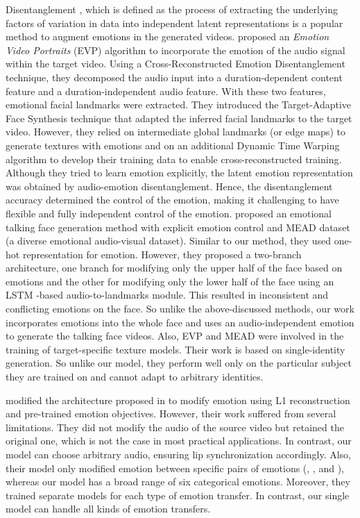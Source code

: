 \documentclass[accepted]{uai2023}
\begin{document}
Disentanglement \citep{Bengio2012RepresentationLA, higgins2017betavae, Mathieu2018DisentanglingDI, Shukla2019PrOSePO, Bhagat2020DisContSV, Bhagat2020DisentanglingMF}, which is defined as the process of extracting the underlying factors of variation in data into independent latent representations is a popular method to augment emotions in the generated videos.
\citet{Ji_2021_CVPR} proposed an \emph{Emotion Video Portraits} (EVP) algorithm to incorporate the emotion of the audio signal within the target video. Using a Cross-Reconstructed Emotion Disentanglement technique, they decomposed the audio input into a duration-dependent content feature and a duration-independent audio feature. With these two features, emotional facial landmarks were extracted. They introduced the Target-Adaptive Face Synthesis technique that adapted the inferred facial landmarks to the target video. However, they relied on intermediate global landmarks (or edge maps) to generate textures with emotions and on an additional Dynamic Time Warping \citep{berndt1994using} algorithm to develop their training data to enable cross-reconstructed training. Although they tried to learn emotion explicitly, the latent emotion representation was obtained by audio-emotion disentanglement. Hence, the disentanglement accuracy determined the control of the emotion, making it challenging to have flexible and fully independent control of the emotion. \citet{wang2020mead} proposed an emotional talking face generation method with explicit emotion control and MEAD dataset (a diverse emotional audio-visual dataset). Similar to our method, they used one-hot representation for emotion. However, they proposed a two-branch architecture, one branch for modifying only the upper half of the face based on emotions and the other for modifying only the lower half of the face using an LSTM \citep{hochreiter1997long}-based audio-to-landmarks module. This resulted in inconsistent and conflicting emotions on the face. So unlike the above-discussed methods, our work incorporates emotions into the whole face and uses an audio-independent emotion to generate the talking face videos. Also, EVP \citep{Ji_2021_CVPR} and MEAD \citep{wang2020mead} were involved in the training of target-specific texture models. Their work is based on single-identity generation. So unlike our model, they perform well only on the particular subject they are trained on and cannot adapt to arbitrary identities.


\citet{magnusson2021invertable} modified the architecture proposed in \citep{prajwal2020lip} to modify emotion using L1 reconstruction and pre-trained emotion objectives. However, their work suffered from several limitations. They did not modify the audio of the source video but retained the original one, which is not the case in most practical applications. 
In contrast, our model can choose arbitrary audio, ensuring lip synchronization accordingly.  Also, their model only modified emotion between specific pairs of emotions ({}, {}, and {}), whereas our model has a broad range of six categorical emotions. Moreover, they trained separate models for each type of emotion transfer. In contrast, our single model can handle all kinds of emotion transfers.
\end{document}
